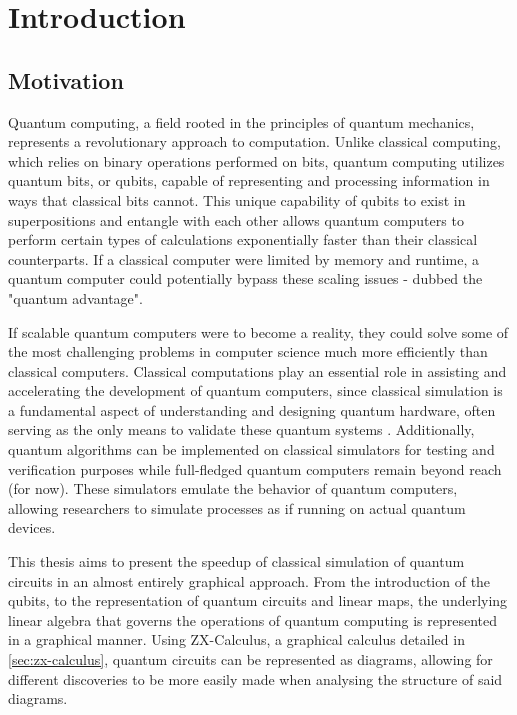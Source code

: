 \chapter{\label{ch:1-intro}Introduction} 

\minitoc

\section{Motivation}

Quantum computing, a field rooted in the principles of quantum mechanics, represents a revolutionary approach to computation. 
Unlike classical computing, which relies on binary operations performed on bits, 
quantum computing utilizes quantum bits, or qubits, capable of representing and processing information in ways that classical bits cannot. 
This unique capability of qubits to exist in superpositions and entangle with each other allows quantum computers 
to perform certain types of calculations exponentially faster than their classical counterparts.
If a classical computer were limited by memory and runtime, 
a quantum computer could potentially bypass these scaling issues - dubbed the "quantum advantage".

If scalable quantum computers were to become a reality, 
they could solve some of the most challenging problems in computer science much more efficiently than classical computers. 
Classical computations play an essential role in assisting and accelerating the development of quantum computers, 
since classical simulation is a fundamental aspect of understanding and designing quantum hardware, 
often serving as the only means to validate these quantum systems \cite{xu2023herculean}. 
Additionally, quantum algorithms can be implemented on classical simulators for testing and verification purposes 
while full-fledged quantum computers remain beyond reach (for now). 
These simulators emulate the behavior of quantum computers, allowing researchers to simulate processes as if running on actual quantum devices.

This thesis aims to present the speedup of classical simulation of quantum circuits in an almost entirely graphical approach.
From the introduction of the qubits, to the representation of quantum circuits and linear maps,
the underlying linear algebra that governs the operations of quantum computing is represented in a graphical manner.
Using ZX-Calculus, a graphical calculus detailed in \autoref{sec:zx-calculus},
quantum circuits can be represented as diagrams, 
allowing for different discoveries to be more easily made when analysing the structure of said diagrams.

